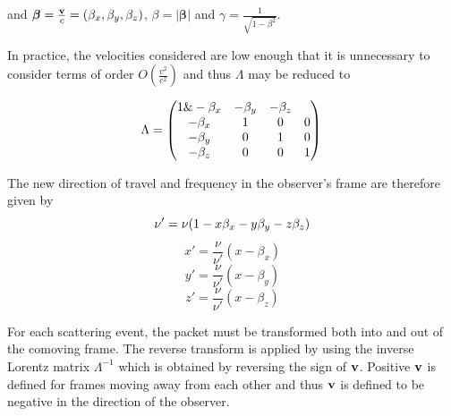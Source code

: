 \documentclass[useAMS,usenatbib,usegraphicx]{mnras}
\begin{document}
 \noindent and $\boldsymbol{\beta}=\frac{{\bf{v}}}{c}=(\beta_x,\beta_y,\beta_z)$,   $\beta=\lvert \boldsymbol{\beta} \rvert$ and $\gamma = \frac{1}{\sqrt{1-\beta^2}}$.


In practice, the velocities considered are low enough that it is 
unnecessary to consider terms of order $O(\frac{v^2}{c^2})$ and thus 
${\Lambda}$ may be reduced to

\begin{equation}
	{\Lambda}=
	 \begin{pmatrix} 
	 1 \& - \beta_x & - \beta_y & - \beta_z \\
	- \beta_x & 1 & 0 & 0 \\
	- \beta_y  & 0 & 1 & 0\\
	- \beta_z & 0 & 0 & 1 \\
	 \end{pmatrix}
	 \\
\end{equation}

\noindent The new direction of travel and frequency in the observer's 
frame are therefore given by  
\begin{equation}
\nu'=\nu(1-x\beta_x-y\beta_y-z\beta_z) \\
\end{equation}
\[
x'=\frac{\nu}{\nu'}(x-\beta_x) 
\]
\[
y'=\frac{\nu}{\nu'}(x-\beta_y) 
\]
\[
z'=\frac{\nu}{\nu'}(x-\beta_z) 
\]

For each scattering event, the packet must be transformed both into and 
out of the comoving frame. The reverse transform is applied by using the 
inverse Lorentz matrix $\Lambda^{-1}$ which is obtained by reversing the 
sign of $\bf{v}$.  Positive $\bf{v}$ is defined for frames moving away 
from each other and thus $\bf{v}$ is defined to be negative in the 
direction of the observer.

\bsp

\label{lastpage}
\end{document}
